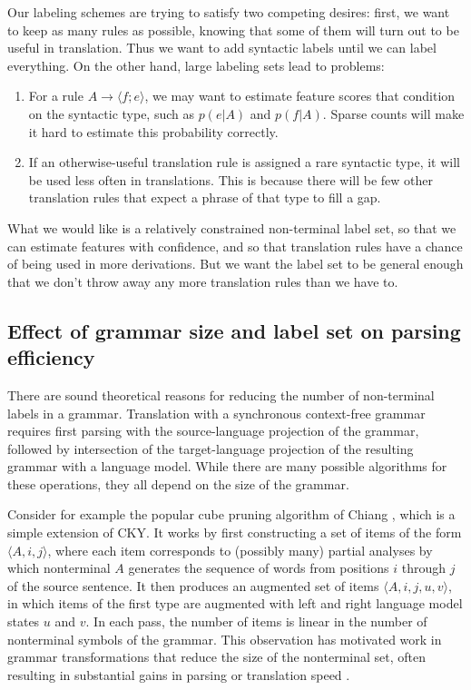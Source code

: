 \documentclass[a4paper]{article}
\begin{document}
Our labeling schemes are trying to satisfy two competing desires: first, we want to keep as many rules as possible, knowing that some of them will turn out to be useful in translation. Thus we want to add syntactic labels until we can label everything. On the other hand, large labeling sets lead to problems:
\begin{enumerate}
\item For a rule $A \to \langle f ; e \rangle$, we may want to estimate feature scores that condition on the syntactic type, such as $p(e|A)$ and $p(f|A)$. Sparse counts will make it hard to estimate this probability correctly.
\item If an otherwise-useful translation rule is assigned a rare syntactic type, it will be used less often in translations. This is because there will be few other translation rules that expect a phrase of that type to fill a gap.
\end{enumerate}
What we would like is a relatively constrained non-terminal label set, so that we can estimate features with confidence, and so that translation rules have a chance of being used in more derivations. But we want the label set to be general enough that we don't throw away any more translation rules than we have to.


\subsection{Effect of grammar size and label set on parsing efficiency}

There are sound theoretical reasons for reducing the number of non-terminal labels in a grammar. Translation with a synchronous context-free grammar requires first parsing with the source-language projection of the grammar, followed by intersection of the target-language projection of the resulting grammar with a language model. While there are many possible algorithms for these operations, they all depend on the size of the grammar.

Consider for example the popular cube pruning algorithm of Chiang
, which is a simple extension of CKY. It works by first
constructing a set of items of the form $\langle A, i, j \rangle$,
where each item corresponds to (possibly many) partial analyses by
which nonterminal $A$ generates the sequence of words from positions
$i$ through $j$ of the source sentence. It then produces an augmented
set of items $\langle A, i, j, u, v \rangle$, in which items of the
first type are augmented with left and right language model states $u$
and $v$. In each pass, the number of items is linear in the number of
nonterminal symbols of the grammar. This observation has motivated
work in grammar transformations that reduce the size of the
nonterminal set, often resulting in substantial gains in parsing or
translation speed \cite{song2008,denero-efficient-parsing,xiao2009}.
\end{document}
